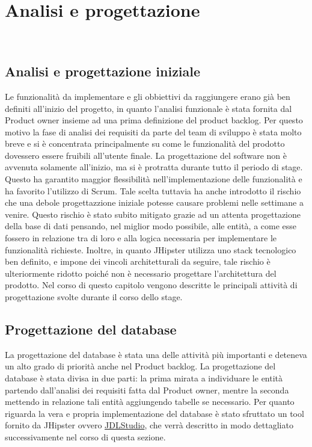 
\chapter{Analisi e progettazione}
\label{cap:analisi}

\\


\section{Analisi e progettazione iniziale}
Le funzionalità da implementare e gli obbiettivi da raggiungere erano già ben definiti all'inizio del progetto, in quanto l'analisi funzionale è stata fornita dal Product owner insieme ad una prima definizione del product backlog.
Per questo motivo la fase di analisi dei requisiti da parte del team di sviluppo è stata molto breve e si è concentrata principalmente su come le funzionalità del prodotto dovessero essere fruibili all'utente finale. La progettazione del software non è avvenuta solamente all'inizio, ma si è protratta durante tutto il periodo di stage. Questo ha garantito maggior flessibilità nell'implementazione delle funzionalità e ha favorito l'utilizzo di Scrum. Tale scelta tuttavia ha anche introdotto il rischio che una debole progettazzione iniziale potesse causare problemi nelle settimane a venire. Questo rischio è stato subito mitigato grazie ad un attenta progettazione della base di dati pensando, nel miglior modo possibile, alle entità, a come esse fossero in relazione tra di loro e alla logica necessaria per implementare le funzionalità richieste. Inoltre, in quanto JHipster utilizza uno stack tecnologico ben definito, e impone dei vincoli architetturali da seguire, tale rischio è ulteriormente ridotto poiché non è necessario progettare l'architettura del prodotto.
Nel corso di questo capitolo vengono descritte le principali attività di progettazione svolte durante il corso dello stage.

\section{Progettazione del database}
La progettazione del database è stata una delle attività più importanti e deteneva un alto grado di priorità anche nel Product backlog. La progettazione del database è stata divisa in due parti: la prima mirata a individuare le entità partendo dall'analisi dei requisiti fatta dal Product owner, mentre la seconda mettendo in relazione tali entità aggiungendo tabelle se necessario. Per quanto riguarda la vera e propria implementazione del database è stato sfruttato un tool fornito da JHipster ovvero \href{https://start.jhipster.tech/jdl-studio/}{JDLStudio}, che verrà descritto in modo dettagliato successivamente nel corso di questa sezione.

